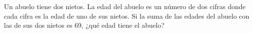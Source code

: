 Un abuelo tiene dos nietos. La edad del abuelo es un número de dos cifras donde cada cifra es la edad de uno de sus nietos. Si la suma de las edades del abuelo con las de sus dos nietos es 69, ¿qué edad tiene el abuelo?